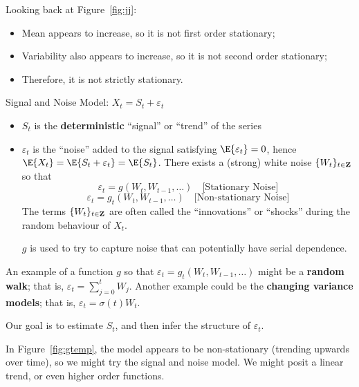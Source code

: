 Looking back at Figure~\ref{fig:jj}:
\begin{itemize}
    \item Mean appears to increase, so it is not first order stationary;
    \item Variability also appears to increase, so it is not
          second order stationary;
    \item Therefore, it is not strictly stationary.
\end{itemize}
Signal and Noise Model: $ X_t=S_t+\varepsilon_t $
\begin{itemize}
    \item $ S_t $ is the \textbf{deterministic}
          ``signal'' or ``trend'' of the series
    \item $ \varepsilon_t $ is the ``noise'' added
          to the signal satisfying $ \E{\varepsilon_t}=0 $, hence
          $ \E{X_t}=\E{S_t+\varepsilon_t}=\E{S_t} $.
          There exists a (strong) white noise $ \{W_t\}_{t\in\mathbf{Z}} $
          so that
          \[ \varepsilon_t=g(W_t,W_{t-1},\ldots)\quad\text{[Stationary Noise]} \]
          \[ \varepsilon_t=g_t(W_t,W_{t-1},\ldots)\quad\text{[Non-stationary Noise]} \]
          The terms $ \{W_t\}_{t\in\mathbf{Z}} $ are often called the
          ``innovations'' or ``shocks'' during the random behaviour
          of $ X_t $.

              {\color{blue}$ g $ is used to try to capture noise that can
                  potentially have serial dependence.}
\end{itemize}
\begin{Example}{}{}
    An example of a function $ g $ so that $ \varepsilon_t=g_t(W_t,W_{t-1},\ldots) $
    might be a \textbf{random walk}; that is, $ \varepsilon_t=\sum_{j=0}^{t} W_j $.
    Another example could be the \textbf{changing variance models}; that is,
    $ \varepsilon_t=\sigma(t)W_t $.
\end{Example}
Our goal is to estimate $ S_t $, and then infer the structure of $ \varepsilon_t $.

In Figure~\ref{fig:gtemp}, the model appears to be non-stationary
(trending upwards over time),
so we might try the signal and noise model. We might posit
a linear trend, or even higher order functions.

